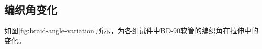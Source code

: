 \begin{figure}[!htb]
{		\label{fig:fail}
	}
	\hspace{0.5cm}
	\label{fig:E3-hose-fail}
\end{figure}





\subsection{编织角变化}
如图\ref{fig:braid-angle-variation}所示，为各组试件中BD-90软管的编织角在拉伸中的变化。

